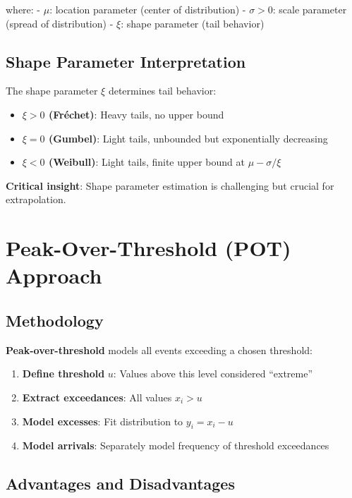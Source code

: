 \documentclass[
  letterpaper,
  DIV=11,
  numbers=noendperiod]{scrreprt}
\providecommand{\tightlist}{%
  \setlength{\itemsep}{0pt}\setlength{\parskip}{0pt}}
\begin{document}
where: - \(\mu\): location parameter (center of distribution) -
\(\sigma > 0\): scale parameter (spread of distribution) - \(\xi\):
shape parameter (tail behavior)

\subsection{Shape Parameter
Interpretation}\label{shape-parameter-interpretation}

The shape parameter \(\xi\) determines tail behavior:

\begin{itemize}
\tightlist
\item
  \textbf{\(\xi > 0\) (Fréchet)}: Heavy tails, no upper bound
\item
  \textbf{\(\xi = 0\) (Gumbel)}: Light tails, unbounded but
  exponentially decreasing
\item
  \textbf{\(\xi < 0\) (Weibull)}: Light tails, finite upper bound at
  \(\mu - \sigma/\xi\)
\end{itemize}

\textbf{Critical insight}: Shape parameter estimation is challenging but
crucial for extrapolation.

\section{Peak-Over-Threshold (POT)
Approach}\label{peak-over-threshold-pot-approach}

\subsection{Methodology}\label{methodology-1}

\textbf{Peak-over-threshold} models all events exceeding a chosen
threshold:

\begin{enumerate}
\def\labelenumi{\arabic{enumi}.}
\tightlist
\item
  \textbf{Define threshold} \(u\): Values above this level considered
  ``extreme''
\item
  \textbf{Extract exceedances}: All values \(x_i > u\)
\item
  \textbf{Model excesses}: Fit distribution to \(y_i = x_i - u\)
\item
  \textbf{Model arrivals}: Separately model frequency of threshold
  exceedances
\end{enumerate}

\subsection{Advantages and
Disadvantages}\label{advantages-and-disadvantages-1}
\end{document}
